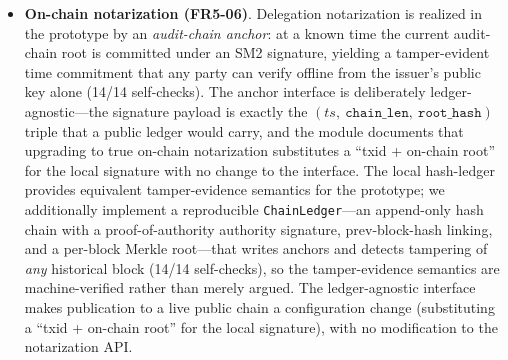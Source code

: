 \documentclass[10pt,twocolumn]{IEEEtran}
\begin{document}
\begin{itemize}
    are all rejected (C2/C3, Section~\ref{sec:e11}), and multi-tenant
    isolation is preserved across all 23 backend-equivalence checks.
    Cross-domain revocation is therefore expressible as a composition
    of per-domain Merkle accumulators together with the \texttt{aud}
    audience binding: a verifier in domain $B$ resolves a credential
    issued by domain $A$ against $A$'s own accumulator, and the
    audience field prevents a credential issued for one domain from
    being presented in another. Cross-domain revocation is now
    additionally \emph{verified} by a federation layer
    (\texttt{federation.py}): a revocation record signed by domain $A$'s
    authority key is verified by a verifier in domain $B$ against $A$'s
    public key resolved from a self-anchoring directory---13/13
    self-checks---covering tamper-evidence, \texttt{jti} binding, and
    stale-version replay rejection. A \emph{live} multi-domain
    deployment presupposes multi-authority infrastructure; the
    federation layer is delivered and machine-verified, and the
    multi-authority extension point is described in
    Section~\ref{sec:escrow}.
  \item \textbf{On-chain notarization (FR5-06)}. Delegation
    notarization is realized in the prototype by an
    \emph{audit-chain anchor}: at a known time the current audit-chain
    root is committed under an SM2 signature, yielding a
    tamper-evident time commitment that any party can verify offline
    from the issuer's public key alone (14/14 self-checks). The anchor
    interface is deliberately ledger-agnostic---the signature payload
    is exactly the $(ts,\ \texttt{chain\_len},\ \texttt{root\_hash})$
    triple that a public ledger would carry, and the module documents
    that upgrading to true on-chain notarization substitutes a
    ``txid + on-chain root'' for the local signature with no change to
    the interface. The local hash-ledger provides equivalent
    tamper-evidence semantics for the prototype; we additionally
    implement a reproducible \texttt{ChainLedger}---an append-only hash
    chain with a proof-of-authority authority signature,
    prev-block-hash linking, and a per-block Merkle root---that writes
    anchors and detects tampering of \emph{any} historical block
    (14/14 self-checks), so the tamper-evidence semantics are
    machine-verified rather than merely argued. The ledger-agnostic
    interface makes publication to a live public chain a configuration
    change (substituting a ``txid + on-chain root'' for the local
    signature), with no modification to the notarization API.

\end{itemize}
\end{document}
